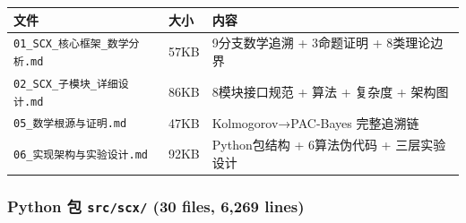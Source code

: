 \documentclass[
  12pt,
]{ctexart}
\begin{document}
\begin{longtable}[]{@{}
  >{\raggedright\arraybackslash}p{}
  >{\raggedright\arraybackslash}p{}
  >{\raggedright\arraybackslash}p{}@{}}
\toprule\noalign{}
\begin{minipage}[b]{\linewidth}\raggedright
文件
\end{minipage} & \begin{minipage}[b]{\linewidth}\raggedright
大小
\end{minipage} & \begin{minipage}[b]{\linewidth}\raggedright
内容
\end{minipage} \\
\midrule\noalign{}
\endhead
\bottomrule\noalign{}
\endlastfoot
\texttt{01\_SCX\_核心框架\_数学分析.md} & 57KB & 9分支数学追溯 +
3命题证明 + 8类理论边界 \\
\texttt{02\_SCX\_子模块\_详细设计.md} & 86KB & 8模块接口规范 + 算法 +
复杂度 + 架构图 \\
\texttt{05\_数学根源与证明.md} & 47KB & Kolmogorov→PAC-Bayes
完整追溯链 \\
\texttt{06\_实现架构与实验设计.md} & 92KB & Python包结构 + 6算法伪代码 +
三层实验设计 \\
\end{longtable}

\subsubsection{\texorpdfstring{Python 包 \texttt{src/scx/} (30 files,
6,269
lines)}{Python 包 src/scx/ (30 files, 6,269 lines)}}\label{python-ux5305-srcscx-30-files-6269-lines}
\end{document}
